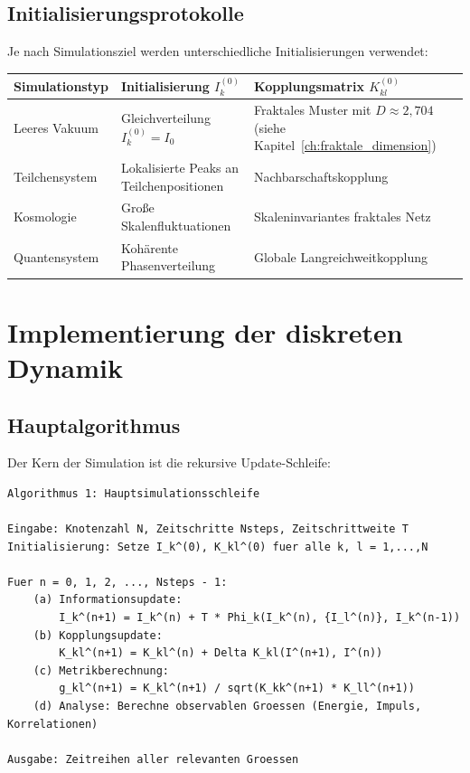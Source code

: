 \subsection{Initialisierungsprotokolle}
\label{sub:numerik_initialisierung}

Je nach Simulationsziel werden unterschiedliche Initialisierungen verwendet:

\begin{tabular}{|l|l|l|}
\hline
\textbf{Simulationstyp} & \textbf{Initialisierung \( I_k^{(0)} \)} & \textbf{Kopplungsmatrix \( K_{kl}^{(0)} \)} \\
\hline
Leeres Vakuum & Gleichverteilung \( I_k^{(0)} = I_0 \) & Fraktales Muster mit \( D \approx 2,704 \) (siehe Kapitel~\ref{ch:fraktale_dimension}) \\
Teilchensystem & Lokalisierte Peaks an Teilchenpositionen & Nachbarschaftskopplung \\
Kosmologie & Gro{\ss}e Skalenfluktuationen & Skaleninvariantes fraktales Netz \\
Quantensystem & Kohärente Phasenverteilung & Globale Langreichweitkopplung \\
\hline
\end{tabular}

\section{Implementierung der diskreten Dynamik}
\label{app:numerik_implementierung}

\subsection{Hauptalgorithmus}
\label{sub:numerik_algorithmus}

Der Kern der Simulation ist die rekursive Update-Schleife:

\begin{verbatim}
Algorithmus 1: Hauptsimulationsschleife

Eingabe: Knotenzahl N, Zeitschritte Nsteps, Zeitschrittweite T
Initialisierung: Setze I_k^(0), K_kl^(0) fuer alle k, l = 1,...,N

Fuer n = 0, 1, 2, ..., Nsteps - 1:
    (a) Informationsupdate:
        I_k^(n+1) = I_k^(n) + T * Phi_k(I_k^(n), {I_l^(n)}, I_k^(n-1))
    (b) Kopplungsupdate:
        K_kl^(n+1) = K_kl^(n) + Delta K_kl(I^(n+1), I^(n))
    (c) Metrikberechnung:
        g_kl^(n+1) = K_kl^(n+1) / sqrt(K_kk^(n+1) * K_ll^(n+1))
    (d) Analyse: Berechne observablen Groessen (Energie, Impuls, Korrelationen)

Ausgabe: Zeitreihen aller relevanten Groessen
\end{verbatim}

